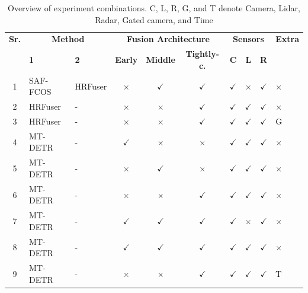\documentclass[report.tex]{subfiles}
\begin{document}
\begin{itemize}
                \begin{table}[h!]
                    \centering
                    \caption{Overview of experiment combinations. C, L, R, G, and T denote Camera, Lidar, Radar, Gated camera, and Time}
                    \begin{tabular}{|c|l|l|c|c|c|c|c|c|l|}
                    \hline
                    \textbf{Sr.} & \multicolumn{2}{c|}{\textbf{Method}} & \multicolumn{3}{c|}{\textbf{Fusion Architecture}} & \multicolumn{3}{c|}{\textbf{Sensors}} & \textbf{Extra} \\
                    \cline{2-9}
                     & \textbf{1} & \textbf{2} & \textbf{Early} & \textbf{Middle} & \textbf{Tightly-c.} & \textbf{C} & \textbf{L} & \textbf{R} &  \\
                    \hline
                    1 & SAF-FCOS & HRFuser & $\times$ & $\checkmark$ & $\checkmark$ & $\checkmark$ & $\times$ & $\checkmark$ & $\times$ \\
                    \hline
                    2 & HRFuser & - & $\times$ & $\times$ & $\checkmark$ & $\checkmark$ & $\checkmark$ & $\checkmark$ & $\times$ \\
                    \hline
                    3 & HRFuser & - & $\times$ & $\times$ & $\checkmark$ & $\checkmark$ & $\checkmark$ & $\checkmark$ & G \\
                    \hline
                    4 & MT-DETR & - & $\checkmark$ & $\times$ & $\times$ & $\checkmark$ & $\checkmark$ & $\checkmark$ & $\times$ \\
                    \hline
                    5 & MT-DETR & - & $\times$ & $\checkmark$ & $\times$ & $\checkmark$ & $\checkmark$ & $\checkmark$ & $\times$ \\
                    \hline
                    6 & MT-DETR & - & $\times$ & $\times$ & $\checkmark$ & $\checkmark$ & $\checkmark$ & $\checkmark$ & $\times$ \\
                    \hline
                    7 & MT-DETR & - & $\checkmark$ & $\checkmark$ & $\checkmark$ & $\checkmark$ & $\times$ & $\checkmark$ & $\times$ \\
                    \hline
                    8 & MT-DETR & - & $\checkmark$ & $\checkmark$ & $\checkmark$ & $\checkmark$ & $\checkmark$ & $\checkmark$ & $\times$ \\
                    \hline
                    9 & MT-DETR & - & $\times$ & $\times$ & $\checkmark$ & $\checkmark$ & $\checkmark$ & $\checkmark$ & T \\

\end{tabular}
\end{table}
\end{itemize}
\end{document}
